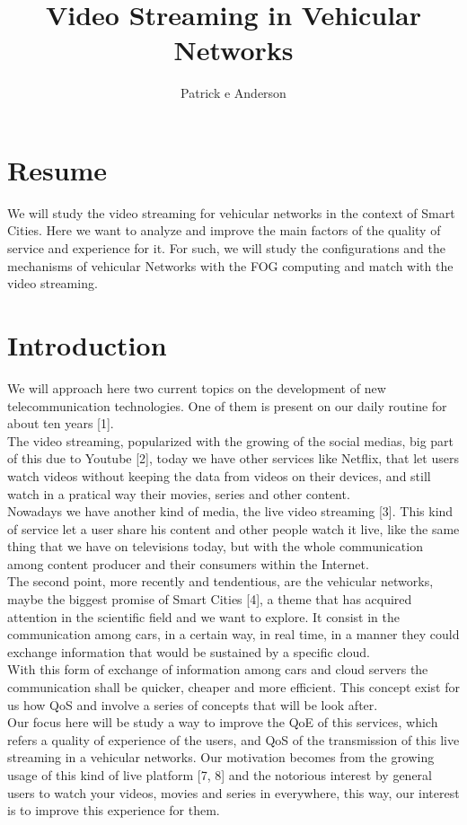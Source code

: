 \documentclass[a4paper]{article}
\title{Video Streaming in Vehicular Networks}
\author{Patrick e Anderson}
\begin{document}
\maketitle 
\section{Resume}
We will study the video streaming for vehicular networks in the context of Smart Cities. Here we want to analyze and improve the main factors of the quality of service and experience for it. For such, we will study the configurations and the mechanisms of vehicular Networks with the FOG computing and match with the video streaming.

\section{Introduction}
We will approach here two current topics on the development of new telecommunication technologies. One of them is present on our daily routine for about ten years [1].\\
The video streaming, popularized with the growing of the social medias, big part of this due to Youtube [2], today we have other services like Netflix, that let users watch videos without keeping the data from videos on their devices, and still watch in a pratical way their movies, series and other content.\\
Nowadays we have another kind of media, the live video streaming [3]. This kind of service let a user share his content and other people watch it live, like the same thing that we have on televisions today, but with the whole communication among content producer and their consumers within the Internet.\\
The second point, more recently and tendentious, are the vehicular networks, maybe the biggest promise of Smart Cities [4], a theme that has acquired attention in the scientific field and we want to explore. It consist in the communication among cars, in a certain way, in real time, in a manner they could exchange information that would be sustained by a specific cloud. \\
With this form of exchange of information among cars and cloud servers the communication shall be quicker, cheaper and more efficient. This concept exist for us how QoS and involve  a series of concepts that will be look after.\\
Our focus here will be study a way to improve the QoE of this services, which refers a quality of experience of the users, and QoS of the transmission of this live streaming in a vehicular networks. Our motivation becomes from the growing usage of this kind of live platform [7, 8] and the notorious interest by general users to watch your videos, movies and series in everywhere, this way, our interest is to improve this experience for them.
\end{document}
